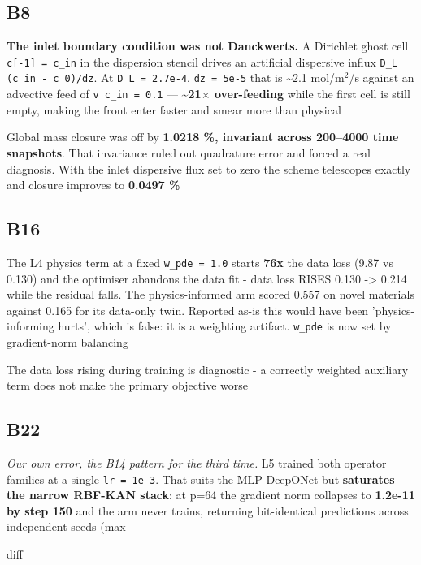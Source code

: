 \documentclass[10pt]{article}
\begin{document}
\subsection*{B8}\label{led:B8}
\begin{description}[leftmargin=0pt,itemsep=1pt]
\item[Defect.] \textbf{The inlet boundary condition was not Danckwerts.} A Dirichlet ghost cell \texttt{c[-1] = c\_in} in the dispersion stencil drives an artificial dispersive influx \texttt{D\_L (c\_in - c\_0)/dz}. At \texttt{D\_L = 2.7e-4}, \texttt{dz = 5e-5} that is \textasciitilde{}2.1 mol/m$^2$/s against an advective feed of \texttt{v c\_in = 0.1} --- \textbf{\textasciitilde{}21$\times$ over-feeding} while the first cell is still empty, making the front enter faster and smear more than physical
\item[How it was caught.] Global mass closure was off by \textbf{1.0218 \%, invariant across 200--4000 time snapshots}. That invariance ruled out quadrature error and forced a real diagnosis. With the inlet dispersive flux set to zero the scheme telescopes exactly and closure improves to \textbf{0.0497 \%}
\end{description}
\subsection*{B16}\label{led:B16}
\begin{description}[leftmargin=0pt,itemsep=1pt]
\item[Defect.] The L4 physics term at a fixed \texttt{w\_pde = 1.0} starts \textbf{76x} the data loss (9.87 vs 0.130) and the optimiser abandons the data fit - data loss RISES 0.130 -> 0.214 while the residual falls. The physics-informed arm scored 0.557 on novel materials against 0.165 for its data-only twin. Reported as-is this would have been 'physics-informing hurts', which is false: it is a weighting artifact. \texttt{w\_pde} is now set by gradient-norm balancing
\item[How it was caught.] The data loss rising during training is diagnostic - a correctly weighted auxiliary term does not make the primary objective worse
\end{description}
\subsection*{B22}\label{led:B22}
\begin{description}[leftmargin=0pt,itemsep=1pt]
\item[Defect.] \emph{Our own error, the B14 pattern for the third time.} L5 trained both operator families at a single \texttt{lr = 1e-3}. That suits the MLP DeepONet but \textbf{saturates the narrow RBF-KAN stack}: at p=64 the gradient norm collapses to \textbf{1.2e-11 by step 150} and the arm never trains, returning bit-identical predictions across independent seeds (max
\item[How it was caught.] diff
\end{description}
\end{document}
